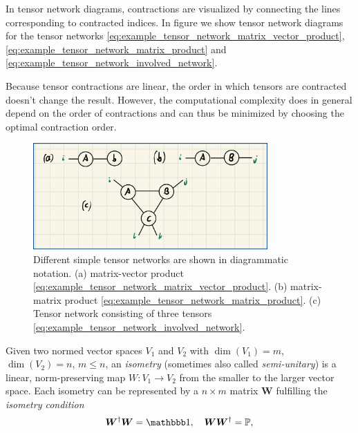 In tensor network diagrams, contractions are visualized by connecting the lines corresponding to contracted indices. In figure  we show tensor network diagrams for the tensor networks \eqref{eq:example_tensor_network_matrix_vector_product}, \eqref{eq:example_tensor_network_matrix_product} and \eqref{eq:example_tensor_network_involved_network}. \par
Because tensor contractions are linear, the order in which tensors are contracted doesn't change the result. However, the computational complexity does in general depend on the order of contractions and can thus be minimized by choosing the optimal contraction order. \par
\begin{figure}
	\centering
	\includegraphics[width=0.8\textwidth]{figures/Tensor_Networks/basic_tensor_network_diagrams.jpeg}
	\caption{Different simple tensor networks are shown in diagrammatic notation. (a) matrix-vector product \eqref{eq:example_tensor_network_matrix_vector_product}. (b) matrix-matrix product \eqref{eq:example_tensor_network_matrix_product}. (c) Tensor network consisting of three tensors \eqref{eq:example_tensor_network_involved_network}.}
	\label{fig:basic_tensor_network_diagrams}
\end{figure}
Given two normed vector spaces $V_1$ and $V_2$ with $\dim\left(V_1\right) = m$, $\dim\left(V_2\right) = n$, $m \le n$, an \textit{isometry} (sometimes also called \textit{semi-unitary}) is a linear, norm-preserving map $W: V_1 \rightarrow V_2$ from the smaller to the larger vector space. Each isometry can be represented by a $n\times m$ matrix $\bm{W}$ fulfilling the \textit{isometry condition}
\begin{equation}
	\label{eq:isometry_condition_general}
	\bm{W}^\dagger\bm{W} = \id, \quad \bm{W}\bm{W}^\dagger = \mathbb{P},
\end{equation}
